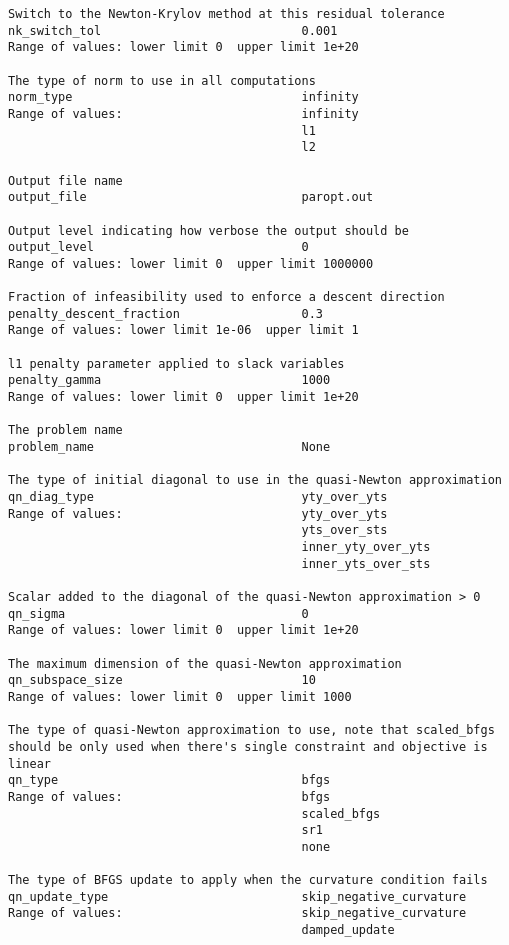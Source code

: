 \documentclass[12pt]{article}
\begin{document}
{\begin{verbatim}
Switch to the Newton-Krylov method at this residual tolerance
nk_switch_tol                            0.001
Range of values: lower limit 0  upper limit 1e+20

The type of norm to use in all computations
norm_type                                infinity
Range of values:                         infinity
                                         l1
                                         l2

Output file name
output_file                              paropt.out

Output level indicating how verbose the output should be
output_level                             0
Range of values: lower limit 0  upper limit 1000000

Fraction of infeasibility used to enforce a descent direction
penalty_descent_fraction                 0.3
Range of values: lower limit 1e-06  upper limit 1

l1 penalty parameter applied to slack variables
penalty_gamma                            1000
Range of values: lower limit 0  upper limit 1e+20

The problem name
problem_name                             None

The type of initial diagonal to use in the quasi-Newton approximation
qn_diag_type                             yty_over_yts
Range of values:                         yty_over_yts
                                         yts_over_sts
                                         inner_yty_over_yts
                                         inner_yts_over_sts

Scalar added to the diagonal of the quasi-Newton approximation > 0
qn_sigma                                 0
Range of values: lower limit 0  upper limit 1e+20

The maximum dimension of the quasi-Newton approximation
qn_subspace_size                         10
Range of values: lower limit 0  upper limit 1000

The type of quasi-Newton approximation to use, note that scaled_bfgs
should be only used when there's single constraint and objective is linear
qn_type                                  bfgs
Range of values:                         bfgs
                                         scaled_bfgs
                                         sr1
                                         none

The type of BFGS update to apply when the curvature condition fails
qn_update_type                           skip_negative_curvature
Range of values:                         skip_negative_curvature
                                         damped_update


\end{verbatim}}
\end{document}

